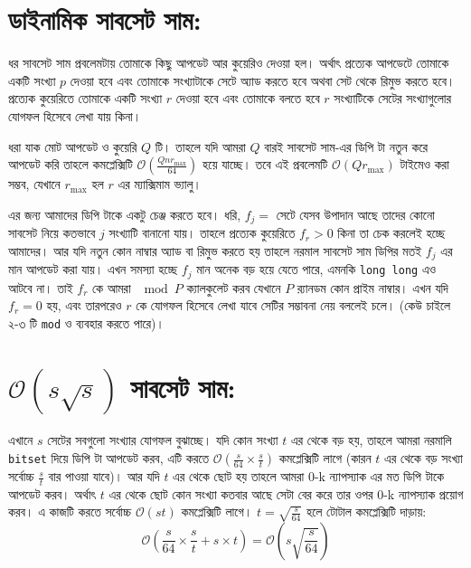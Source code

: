 \section{ডাইনামিক সাবসেট সাম:}
ধর সাবসেট সাম প্রবলেমটায় তোমাকে কিছু আপডেট আর কুয়েরিও দেওয়া হল। অর্থাৎ প্রত্যেক আপডেটে তোমাকে একটি সংখ্যা \(p\) দেওয়া হবে এবং তোমাকে সংখ্যাটাকে সেটে  অ্যাড করতে হবে অথবা সেট থেকে রিমুভ করতে হবে। প্রত্যেক কুয়েরিতে তোমাকে একটি সংখ্যা \(r\) দেওয়া হবে এবং তোমাকে বলতে হবে \(r\) সংখ্যাটিকে সেটের সংখ্যাগুলোর যোগফল হিসেবে লেখা যায় কিনা। 

ধরা যাক মোট আপডেট ও কুয়েরি \(Q\) টি। তাহলে যদি আমরা \(Q\) বারই সাবসেট সাম-এর ডিপি টা নতুন করে আপডেট করি তাহলে কমপ্লেক্সিটি \(\mathcal{O}(\frac{Qnr_{\max}}{64})\) হয়ে যাচ্ছে। তবে এই প্রবলেমটি \(\mathcal{O}(Qr_{\max})\) টাইমেও করা সম্ভব, যেখানে \(r_{\max}\) হল \(r\) এর ম্যাক্সিমাম ভ্যালু।     

এর জন্য আমাদের ডিপি টাকে একটু চেঞ্জ করতে হবে। ধরি, \(f_j = \) সেটে যেসব উপাদান আছে তাদের কোনো সাবসেট নিয়ে কতভাবে \(j\) সংখ্যাটি বানানো যায়। তাহলে প্রত্যেক কুয়েরিতে \(f_r > 0\) কিনা তা চেক করলেই হচ্ছে আমাদের।  আর যদি নতুন কোন নাম্বার অ্যাড বা রিমুভ করতে হয় তাহলে নরমাল সাবসেট সাম ডিপির মতই \(f_j\) এর মান আপডেট করা যায়। এখন সমস্যা হচ্ছে \(f_j\) মান অনেক বড় হয়ে যেতে পারে, এমনকি \texttt{long long} এও আটবে না। তাই \(f_r\) কে আমরা \(\mod P\) ক্যালকুলেট করব যেখানে \(P\) র‍্যানডম কোন প্রাইম নাম্বার। এখন যদি \(f_r = 0\) হয়, এবং তারপরেও \(r\) কে যোগফল হিসেবে লেখা যাবে সেটির সম্ভাবনা নেয় বললেই চলে। (কেউ চাইলে ২-৩ টি \texttt{mod} ও ব্যবহার করতে পারে)।

\section{\(\mathcal{O} \left ( s \sqrt{s} \right )\) সাবসেট সাম:} 
এখানে \(s\) সেটের সবগুলো সংখ্যার যোগফল বুঝাচ্ছে।  যদি কোন সংখ্যা \(t\) এর থেকে বড় হয়, তাহলে আমরা নরমালি \texttt{bitset} দিয়ে ডিপি টা আপডেট করব, এটি করতে \(\mathcal{O} \left ( \frac{s}{64} \times \frac{s}{t} \right )\) কমপ্লেক্সিটি লাগে (কারন \(t\) এর থেকে বড় সংখ্যা সর্বোচ্চ \(\frac{s}{t}\) বার পাওয়া যাবে)। আর যদি \(t\) এর থেকে ছোট হয় তাহলে আমরা 0-k ন্যাপস্যাক এর মত ডিপি টাকে আপডেট করব। অর্থাৎ \(t\) এর থেকে ছোট কোন সংখ্যা কতবার আছে সেটা বের করে তার ওপর 0-k ন্যাপস্যাক প্রয়োগ করব। এ কাজটি করতে সর্বোচ্চ \(\mathcal{O}(st)\) কমপ্লেক্সিটি লাগে।  \(t = \sqrt{\frac{s}{64}}\) হলে টোটাল কমপ্লেক্সিটি দাড়ায়: 
\[\mathcal{O} \left ( \frac{s}{64} \times \frac{s}{t} + s \times t \right ) = \mathcal{O} \left ( s \sqrt{ \frac{s}{64} } \right )\]


